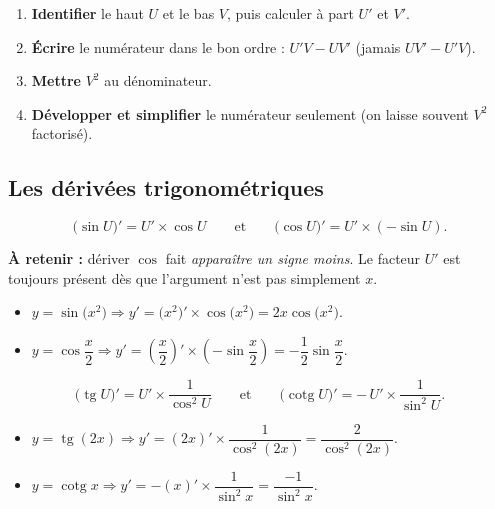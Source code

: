 \documentclass[11pt,a4paper]{article}
\newcommand{\tg}{\operatorname{tg}}
\newcommand{\cotg}{\operatorname{cotg}}
\begin{document}
\begin{commentfaire}
\begin{enumerate}[leftmargin=1.8em,topsep=2pt,itemsep=2pt]
  \item \textbf{Identifier} le haut $U$ et le bas $V$, puis calculer à part $U'$ et $V'$.
  \item \textbf{Écrire} le numérateur dans le bon ordre : $U'V - UV'$ (jamais $UV'-U'V$).
  \item \textbf{Mettre} $V^2$ au dénominateur.
  \item \textbf{Développer et simplifier} le numérateur seulement (on laisse souvent $V^2$ factorisé).
\end{enumerate}
\end{commentfaire}

\subsection{Les dérivées trigonométriques}

\begin{formule}
\[
   \big(\sin U\big)' = U'\times\cos U
   \qquad\text{et}\qquad
   \big(\cos U\big)' = U'\times(-\sin U).
\]
\end{formule}
\noindent \textbf{À retenir :} dériver $\cos$ fait \emph{apparaître un signe moins}. Le facteur $U'$
est toujours présent dès que l'argument n'est pas simplement $x$.

\begin{exemple}
\begin{itemize}[leftmargin=1.5em,topsep=2pt,itemsep=4pt]
  \item $y=\sin\big(x^2\big) \Rightarrow y'=\big(x^2\big)'\times\cos\big(x^2\big)=2x\cos\big(x^2\big).$
  \item $y=\cos\dfrac{x}{2} \Rightarrow y'=\left(\dfrac{x}{2}\right)'\times\left(-\sin\dfrac{x}{2}\right)
        =-\dfrac12\sin\dfrac{x}{2}.$
\end{itemize}
\end{exemple}

\begin{formule}
\[
   \big(\tg U\big)' = U'\times\frac{1}{\cos^2 U}
   \qquad\text{et}\qquad
   \big(\cotg U\big)' = -\,U'\times\frac{1}{\sin^2 U}.
\]
\end{formule}

\begin{exemple}[Dérivée de $\tg$ et $\cotg$]
\begin{itemize}[leftmargin=1.5em,topsep=2pt,itemsep=4pt]
  \item $y=\tg(2x)\Rightarrow y'=(2x)'\times\dfrac{1}{\cos^2(2x)}=\dfrac{2}{\cos^2(2x)}.$
  \item $y=\cotg x\Rightarrow y'=-(x)'\times\dfrac{1}{\sin^2 x}=\dfrac{-1}{\sin^2 x}.$
\end{itemize}
\end{exemple}
\end{document}
